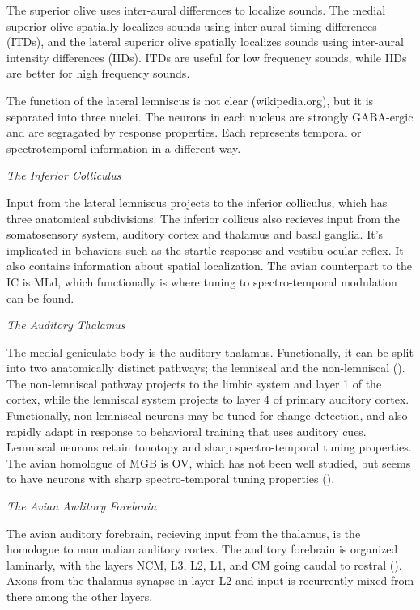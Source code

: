 \documentclass[12pt,article,oneside]{memoir}
\begin{document}
The superior olive uses inter-aural differences to
localize sounds. The medial superior olive spatially localizes sounds using inter-aural
timing differences (ITDs), and the lateral superior olive spatially
localizes sounds using inter-aural intensity differences (IIDs). ITDs are useful for
low frequency sounds, while IIDs are better for high frequency sounds.

The function of the lateral lemniscus is not clear (wikipedia.org), but it is separated into three
nuclei. The neurons in each nucleus are strongly GABA-ergic and are segragated by
response properties. Each represents temporal or spectrotemporal information in
a different way.

\bigskip
\noindent \textit{The Inferior Colliculus}

Input from the lateral lemniscus projects to the inferior colliculus, which has three
anatomical subdivisions. The inferior collicus also recieves input from the somatosensory
system, auditory cortex and thalamus and basal ganglia. It's implicated in behaviors such
as the startle response and vestibu-ocular reflex. It also contains information about spatial
localization. The avian counterpart to the IC is MLd, which functionally is where tuning
to spectro-temporal modulation can be found.

\bigskip
\noindent \textit{The Auditory Thalamus}

The medial geniculate body is the auditory thalamus. Functionally, it can be split
into two anatomically distinct pathways; the lemniscal and the non-lemniscal
(\cite{Hu2003a}). The non-lemniscal pathway projects to the limbic system and layer
1 of the cortex, while the lemniscal system projects to layer 4 of primary auditory cortex.
Functionally, non-lemniscal neurons may be tuned for change detection, and also rapidly
adapt in response to behavioral training that uses auditory cues. Lemniscal neurons retain
tonotopy and sharp spectro-temporal tuning properties. The avian homologue of MGB is OV, which has
not been well studied, but seems to have neurons with sharp spectro-temporal tuning 
properties (\cite{Amin2010}).

\bigskip
\noindent \textit{The Avian Auditory Forebrain}

The avian auditory forebrain, recieving input from the thalamus, is the homologue to
mammalian auditory cortex. The auditory forebrain is organized laminarly, with the
layers NCM, L3, L2, L1, and CM going caudal to rostral (\cite{Wang2010}). Axons from
the thalamus synapse in layer L2 and input is recurrently mixed from there among the
other layers.
\end{document}
